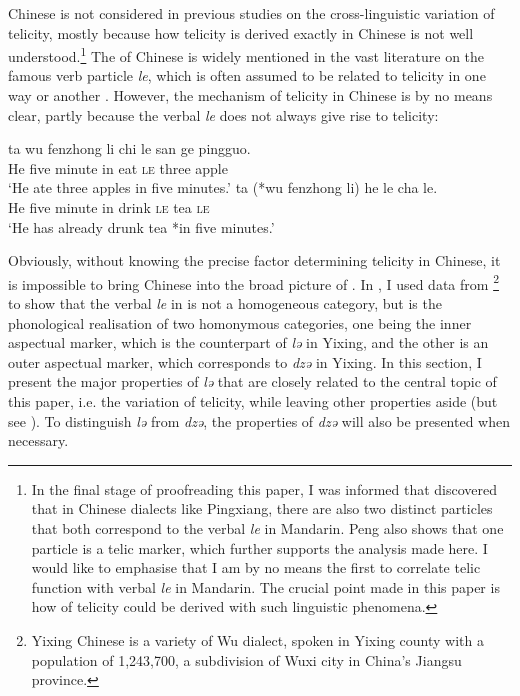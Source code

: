 \documentclass[output=paper]{langsci/langscibook}
\begin{document}
Chinese is not considered in previous studies on the cross-linguistic
variation of telicity, mostly because how telicity is derived exactly in
Chinese is not well understood.\footnote{In the final stage of proofreading
    this paper, I was informed that \textcite{Peng2017} discovered that in
    Chinese dialects like Pingxiang, there are also two distinct particles that
    both correspond to the verbal \emph{le} in Mandarin. Peng also shows that
    one particle is a telic marker, which further supports the analysis made
    here. I would like to emphasise that I am by no means the first to
    correlate telic function with verbal \emph{le} in Mandarin. The crucial
    point made in this paper is how  of telicity could be derived
with such linguistic phenomena.} The  of Chinese is widely
mentioned in the vast literature on the famous verb particle \emph{le}, which
is often assumed to be related to telicity in one way or another
\citep[cf.][]{smith1997parameter,lin2003aspectual,soh2007over,soh2009speaker,soh2014aspect}.
However, the mechanism of telicity in Chinese is by no means clear, partly
because the verbal \emph{le} does not always give rise to telicity:

\begin{exe}
\ex {} \begin{xlist}
	\ex\label{Yixing1} \gll ta wu fenzhong li chi le san ge pingguo. \\
	                        He five minute in eat \textsc{le} three \Clf{} apple \\
	                   \glt \enquote*{He ate three apples in five minutes.}
    \ex\label{Yixing2} \gll  ta (*wu fenzhong li) he le cha le. \\
                            He \hphantom{(*}five minute in drink \textsc{le} tea \textsc{le} \\
                       \glt \enquote*{He has already drunk tea *in five minutes.}
\end{xlist}
\end{exe}

Obviously, without knowing the precise factor determining telicity in Chinese,
it is impossible to bring Chinese into the broad picture of .  In \textcite{Huxuhui2016}, I used data from \footnote{Yixing Chinese is a variety of Wu dialect, spoken
in Yixing county with a population of 1,243,700, a subdivision of Wuxi city in
China’s Jiangsu province.} to show that the verbal \emph{le} in  is not
a homogeneous category, but is the phonological realisation of two homonymous
categories, one being the inner aspectual marker, which is the counterpart of
\emph{lə} in Yixing, and the other is an outer aspectual marker, which
corresponds to \emph{dzə} in Yixing.  In this section, I present the major
properties of \emph{lə} that are closely related to the central topic of this
paper, i.e. the variation of telicity, while leaving other properties aside
(but see \citealt{Huxuhui2016}). To distinguish \emph{lə} from \emph{dzə}, the
properties of \emph{dzə} will also be presented when necessary.
\end{document}
